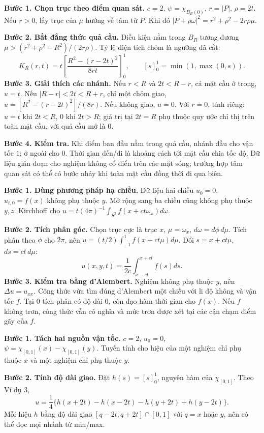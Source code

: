 \textbf{Bước 1. Chọn trục theo điểm quan sát.} $c=2$, $\psi=\chi_{B_R(0)}$, $r=|P|$, $\rho=2t$. Nếu $r>0$, lấy trục của $\mu$ hướng về tâm từ $P$. Khi đó $|P+\rho\omega|^2=r^2+\rho^2-2r\rho\mu$.

\textbf{Bước 2. Bất đẳng thức quả cầu.} Điều kiện nằm trong $B_R$ tương đương $\mu>(r^2+\rho^2-R^2)/(2r\rho)$. Tỷ lệ diện tích chỏm là ngưỡng đã cắt:
\[K_R(r,t)=t\left[\frac{R^2-(r-2t)^2}{8rt}\right]_0^1,\qquad [s]_0^1=\min(1,\max(0,s)).\]
\textbf{Bước 3. Giải thích các nhánh.} Nếu $r<R$ và $2t<R-r$, cả mặt cầu ở trong, $u=t$. Nếu $|R-r|<2t<R+r$, chỉ một chỏm giao, $u=[R^2-(r-2t)^2]/(8r)$. Nếu không giao, $u=0$. Với $r=0$, tính riêng: $u=t$ khi $2t<R$, $0$ khi $2t>R$; giá trị tại $2t=R$ phụ thuộc quy ước chỉ thị trên toàn mặt cầu, với quả cầu mở là $0$.

\textbf{Bước 4. Kiểm tra.} Khi điểm ban đầu nằm trong quả cầu, nhánh đầu cho vận tốc $1$; ở ngoài cho $0$. Thời gian đến/đi là khoảng cách tới mặt cầu chia tốc độ. Dữ liệu gián đoạn cho nghiệm không cổ điển trên các mặt sóng; trường hợp tâm quan sát có thể có bước nhảy khi toàn mặt cầu đồng thời đi qua biên.

\textbf{Bước 1. Dùng phương pháp hạ chiều.} Dữ liệu hai chiều $u_0=0$, $u_{t,0}=f(x)$ không phụ thuộc $y$. Mở rộng sang ba chiều cũng không phụ thuộc $y,z$. Kirchhoff cho $u=t(4\pi)^{-1}\int_{S^2}f(x+ct\omega_x)d\omega$.

\textbf{Bước 2. Tích phân góc.} Chọn trục cực là trục $x$, $\mu=\omega_x$, $d\omega=d\phi\,d\mu$. Tích phân theo $\phi$ cho $2\pi$, nên $u=(t/2)\int_{-1}^1f(x+ct\mu)d\mu$. Đổi $s=x+ct\mu$, $ds=ct\,d\mu$:
\[u(x,y,t)=\frac1{2c}\int_{x-ct}^{x+ct}f(s)ds.\]
\textbf{Bước 3. Kiểm tra bằng d'Alembert.} Nghiệm không phụ thuộc $y$, nên $\Delta u=u_{xx}$. Công thức vừa tìm đúng d'Alembert một chiều với li độ không và vận tốc $f$. Tại $0$ tích phân có độ dài $0$, còn đạo hàm thời gian cho $f(x)$. Nếu $f$ không trơn, công thức vẫn có nghĩa và mức trơn được xét tại các cận chạm điểm gãy của $f$.

\textbf{Bước 1. Tách hai nguồn vận tốc.} $c=2$, $u_0=0$, $\psi=\chi_{[0,1]}(x)-\chi_{[0,1]}(y)$. Tuyến tính cho hiệu của một nghiệm chỉ phụ thuộc $x$ và một nghiệm chỉ phụ thuộc $y$.

\textbf{Bước 2. Tính độ dài giao.} Đặt $h(s)=[s]_0^1$, nguyên hàm của $\chi_{[0,1]}$. Theo Ví dụ 3,
\[u=\frac14\{h(x+2t)-h(x-2t)-h(y+2t)+h(y-2t)\}.\]
Mỗi hiệu $h$ bằng độ dài giao $[q-2t,q+2t]\cap[0,1]$ với $q=x$ hoặc $y$, nên có thể đọc mọi nhánh từ min/max.


